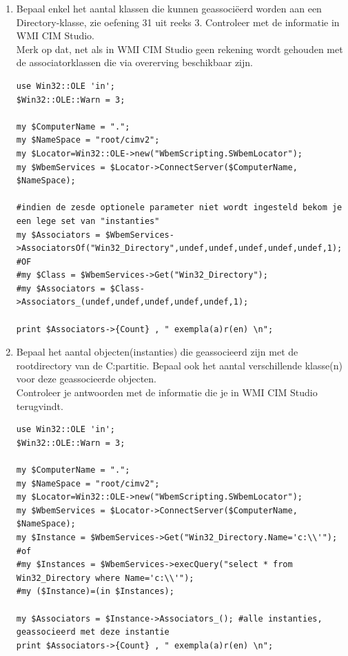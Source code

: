 \documentclass[11pt,a4paper]{report}
\begin{document}
\begin{enumerate}[resume]
	\item Bepaal enkel het aantal klassen die kunnen geassociëerd worden aan een Directory-klasse, zie oefening 31 uit reeks 3. Controleer met de informatie in WMI CIM Studio.
	\\Merk op dat, net als in WMI CIM Studio geen rekening wordt gehouden met de associatorklassen die via overerving beschikbaar zijn.
	\begin{lstlisting}
use Win32::OLE 'in';
$Win32::OLE::Warn = 3;

my $ComputerName = ".";
my $NameSpace = "root/cimv2";
my $Locator=Win32::OLE->new("WbemScripting.SWbemLocator");
my $WbemServices = $Locator->ConnectServer($ComputerName, $NameSpace);

#indien de zesde optionele parameter niet wordt ingesteld bekom je een lege set van "instanties"
my $Associators = $WbemServices->AssociatorsOf("Win32_Directory",undef,undef,undef,undef,undef,1);
#OF
#my $Class = $WbemServices->Get("Win32_Directory");
#my $Associators = $Class->Associators_(undef,undef,undef,undef,undef,1);

print $Associators->{Count} , " exempla(a)r(en) \n";
	\end{lstlisting}
	\item Bepaal het aantal objecten(instanties) die geassocieerd zijn met de rootdirectory van de C:partitie.
	Bepaal ook het aantal verschillende klasse(n) voor deze geassocieerde objecten.
	\\Controleer je antwoorden met de informatie die je in WMI CIM Studio terugvindt.
	\begin{lstlisting}
use Win32::OLE 'in';
$Win32::OLE::Warn = 3;

my $ComputerName = ".";
my $NameSpace = "root/cimv2";
my $Locator=Win32::OLE->new("WbemScripting.SWbemLocator");
my $WbemServices = $Locator->ConnectServer($ComputerName, $NameSpace);
my $Instance = $WbemServices->Get("Win32_Directory.Name='c:\\'");
#of
#my $Instances = $WbemServices->execQuery("select * from Win32_Directory where Name='c:\\'");
#my ($Instance)=(in $Instances);

my $Associators = $Instance->Associators_(); #alle instanties, geassocieerd met deze instantie
print $Associators->{Count} , " exempla(a)r(en) \n";


\end{lstlisting}
\end{enumerate}
\end{document}
